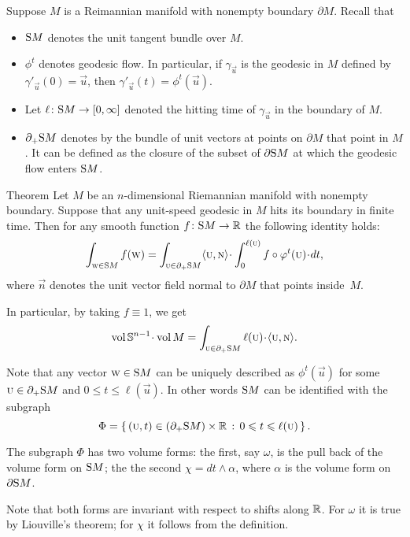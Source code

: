 Suppose $M$ is a Reimannian manifold with nonempty boundary $\partial M$.
Recall that 
\begin{itemize}
\item $\S M$ denotes the unit tangent bundle over $M$.
\item $\phi^t$ denotes geodesic flow.
In particular, if $\gamma_{\vec u}$ is the geodesic in $M$ defined by $\gamma'_{\vec u}(0)=\vec u$, then $\gamma'_{\vec u}(t)=\phi^t(\vec u)$.
\item Let $\ell\:\S M\to [0,\infty]$ denoted the hitting time of $\gamma_{\vec u}$ in the boundary of $M$.
\item $\partial_+\S  M$ denotes by the bundle of unit vectors at points on $\partial M$ that point in $M$. It can be defined as the closure of the subset of $\partial \S M$ at which the geodesic flow enters $\S M$.

\end{itemize}

\begin{thm}{Theorem}\label{thm:santalo}
Let $M$ be an $n$-dimensional Riemannian manifold with nonempty boundary.
Suppose that any unit-speed geodesic in $M$ hits its boundary in finite time.
Then for any smooth function $f\:\S M\to\RR$ the following identity holds:
\[\int_{\vec w\in \S M}f(\vec w)
=
\int_{\vec u\in \partial_+\S  M} 
\langle\vec u,\vec n\rangle\cdot
\int_0^{\ell(\vec u)} f\circ\phi^t(\vec u)\cdot dt,\]
where $\vec n$ denotes the unit vector field normal to $\partial M$ that points inside~$M$.

In particular, by taking $f\equiv 1$, we get
\[\vol\SSS^{n-1}\cdot\vol M=\int_{\vec u\in \partial_+\S  M} \ell(\vec u)\cdot\langle\vec u,\vec n\rangle.\]

\end{thm}

Note that any vector $\vec w\in\S M$ can be uniquely described as $\phi^t(\vec u)$ for some $\vec u\in \partial_+\S  M$ and $0\le t\le \ell(\vec u)$.
In other words $\S M$ can be identified with the subgraph 
\[\Phi=\set{(\vec u,t)\in (\partial_+\S  M)\times \RR}{0\le t\le \ell(\vec u)}.\]

The subgraph $\Phi$ has two volume forms: the first, say $\omega$, is the pull back of the volume form  on $\S M$;
the the second $\chi=dt \wedge \alpha$, where $\alpha$ is the volume form on $\partial\S  M$.

Note that both forms are invariant with respect to shifts along $\RR$.
For $\omega$ it is true by Liouville's theorem;
for $\chi$ it follows from the definition.

